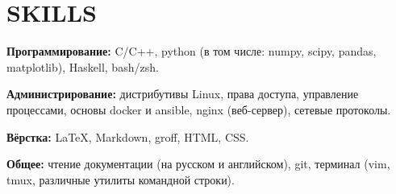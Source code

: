 \section{SKILLS}

\begin{description}

    \setlength\itemsep{-0.4em}

    \item{\bfseries Программирование:}
    C/C++, python (в том числе: numpy, scipy, pandas, matplotlib), Haskell, bash/zsh.

    \item{\bfseries Администрирование:}
    дистрибутивы Linux, права доступа, управление процессами, основы docker и ansible, nginx (веб-сервер),
    сетевые протоколы.
    
    \item{\bfseries Вёрстка:}
    \LaTeX, Markdown, groff, HTML, CSS.

    \item{\bfseries Общее:}
    чтение документации (на русском и английском), git, терминал (vim, tmux, различные утилиты командной строки).

\end{description}
    
    \vspace{.7em}
